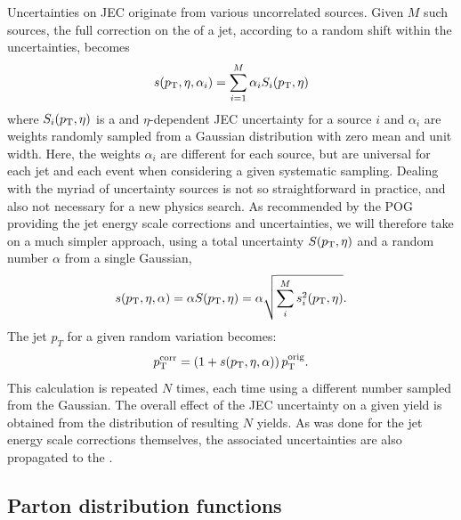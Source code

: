 Uncertainties on JEC originate from various uncorrelated sources.   
Given $M$ such sources, the full correction on the \pt of a jet, according to a random shift
within the uncertainties, becomes 
\begin{equation}
s(p_{\mathrm{T}}, \eta, \alpha_i) = \sum_{i=1}^M \alpha_i S_i (p_{\mathrm{T}}, \eta)
\end{equation}
where $S_i (p_{\mathrm{T}}, \eta)$ is a \pt and $\eta$-dependent JEC uncertainty for a source $i$ and
$\alpha_i$ are weights randomly sampled from a Gaussian distribution with zero mean and unit
width. 
Here, the weights $\alpha_i$ are different for each source, but are universal for each jet and each
event when considering a given systematic sampling.
Dealing with the myriad of uncertainty sources is not so straightforward in practice, and also not
necessary for a new physics search. As recommended by the POG providing the jet energy scale
corrections and uncertainties, we will therefore take on a much simpler approach, using a total
uncertainty $S (p_{\mathrm{T}}, \eta)$ and a random number $\alpha$ from a single Gaussian,
\begin{equation}
s(p_{\mathrm{T}}, \eta, \alpha) = \alpha S (p_{\mathrm{T}}, \eta) = \alpha \sqrt {\sum_i^M s_i^2 (p_{\mathrm{T}}, \eta) }.
\end{equation}
The jet $p_T$ for a given random variation becomes:
\begin{equation}
p_{\mathrm{T}}^{\rm corr} = \left(1 + s(p_{\mathrm{T}}, \eta, \alpha)\right) p_{\mathrm{T}}^{\rm orig}.
\end{equation}
This calculation is repeated $N$ times, each time using a different number sampled from the
Gaussian.  
The overall effect of the JEC uncertainty on a given yield is obtained from the distribution of
resulting $N$ yields.  
As was done for the jet energy scale corrections themselves, the associated uncertainties are also
propagated to the \VEtmiss.


\subsection{Parton distribution functions \label{sec:boost_pdf_unc}} 

